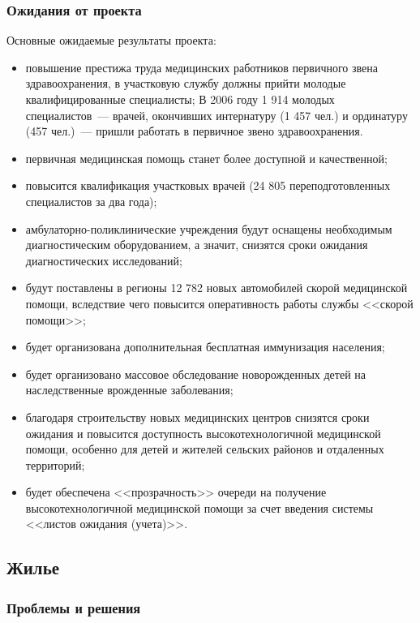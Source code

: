 \documentclass[article, 12pt, russian, oneside]{ncc}
\begin{document}
\subsubsection{Ожидания от проекта}

Основные ожидаемые результаты проекта:

\begin{itemize}
\item повышение престижа труда медицинских работников первичного звена здравоохранения, в участковую службу должны прийти молодые квалифицированные специалисты; В 2006 году 1 914 молодых специалистов~--- врачей, окончивших интернатуру (1 457 чел.) и ординатуру (457 чел.)~--- пришли работать в первичное звено здравоохранения.
\item первичная медицинская помощь станет более доступной и качественной;
\item повысится квалификация участковых врачей (24 805 переподготовленных специалистов за два года);
\item амбулаторно-поликлинические учреждения будут оснащены необходимым диагностическим оборудованием, а значит, снизятся сроки ожидания диагностических исследований;
\item будут поставлены в регионы 12 782 новых автомобилей скорой медицинской помощи, вследствие чего повысится оперативность работы службы <<скорой помощи>>;
\item будет организована дополнительная бесплатная иммунизация населения;
\item будет организовано массовое обследование новорожденных детей на наследственные врожденные заболевания;
\item благодаря строительству новых медицинских центров снизятся сроки ожидания и повысится доступность высокотехнологичной медицинской помощи, особенно для детей и жителей сельских районов и отдаленных территорий;
\item будет обеспечена <<прозрачность>> очереди на получение высокотехнологичной медицинской помощи за счет введения системы <<листов ожидания (учета)>>.
\end{itemize}

\subsection{Жилье}

\subsubsection{Проблемы и решения}
\end{document}
